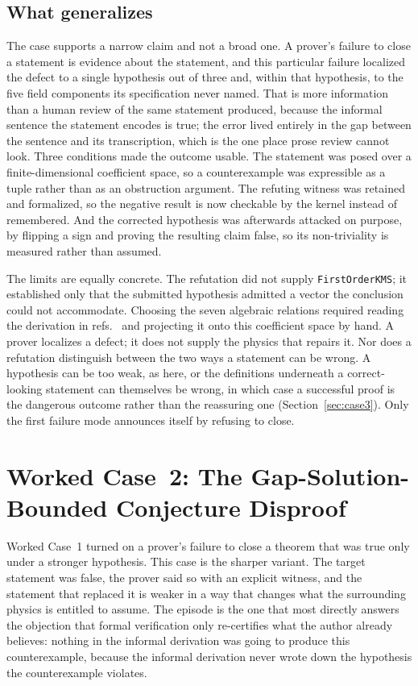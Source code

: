 \documentclass[11pt]{article}
\begin{document}
\subsection{What generalizes}

The case supports a narrow claim and not a broad one. A prover's failure
to close a statement is evidence about the statement, and this
particular failure localized the defect to a single hypothesis out of
three and, within that hypothesis, to the five field components its
specification never named. That is more information than a human review
of the same statement produced, because the informal sentence the
statement encodes is true; the error lived entirely in the gap between
the sentence and its transcription, which is the one place prose review
cannot look. Three conditions made the outcome usable. The statement was
posed over a finite-dimensional coefficient space, so a counterexample
was expressible as a tuple rather than as an obstruction argument. The
refuting witness was retained and formalized, so the negative result is
now checkable by the kernel instead of remembered. And the corrected
hypothesis was afterwards attacked on purpose, by flipping a sign and
proving the resulting claim false, so its non-triviality is measured
rather than assumed.

The limits are equally concrete. The refutation did not supply
\texttt{FirstOrderKMS}; it established only that the submitted
hypothesis admitted a vector the conclusion could not accommodate.
Choosing the seven algebraic relations required reading the derivation
in refs.~\cite{CrossleyGloriosoLiu2017,GloriosoCrossleyLiu2017} and
projecting it onto this coefficient space by hand. A prover localizes a
defect; it does not supply the physics that repairs it. Nor does a
refutation distinguish between the two ways a statement can be wrong. A
hypothesis can be too weak, as here, or the definitions underneath a
correct-looking statement can themselves be wrong, in which case a
successful proof is the dangerous outcome rather than the reassuring one
(Section~\ref{sec:case3}). Only the first failure mode announces itself
by refusing to close.

\section{Worked Case~2: The Gap-Solution-Bounded Conjecture Disproof}
\label{sec:case2}

Worked Case~1 turned on a prover's failure to close a theorem that was
true only under a stronger hypothesis. This case is the sharper
variant. The target statement was false, the prover said so with an
explicit witness, and the statement that replaced it is weaker in a way
that changes what the surrounding physics is entitled to assume. The
episode is the one that most directly answers the objection that formal
verification only re-certifies what the author already believes:
nothing in the informal derivation was going to produce this
counterexample, because the informal derivation never wrote down the
hypothesis the counterexample violates.
\end{document}
